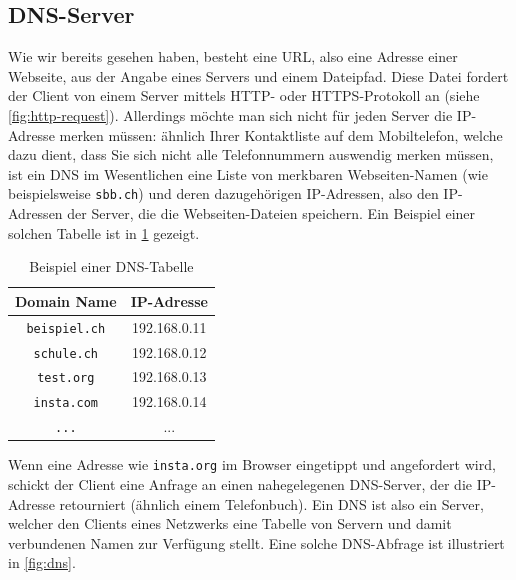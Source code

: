 \subsection{\texorpdfstring{\gls{DNS}-Server}{DNS-Server}}
Wie wir bereits gesehen haben, besteht eine \gls{URL}, also eine Adresse einer Webseite, aus der Angabe eines Servers und einem Dateipfad. Diese Datei fordert der Client von einem Server mittels \gls{HTTP}- oder \gls{HTTPS}-Protokoll an (siehe \cref{fig:http-request}). Allerdings möchte man sich nicht für jeden Server die IP-Adresse merken müssen: ähnlich Ihrer Kontaktliste auf dem Mobiltelefon, welche dazu dient, dass Sie sich nicht alle Telefonnummern auswendig merken müssen, ist ein \gls{DNS} im Wesentlichen eine Liste von merkbaren Webseiten-Namen (wie beispielsweise \texttt{sbb.ch}) und deren dazugehörigen \gls{IP}-Adressen, also den \gls{IP}-Adressen der Server, die die Webseiten-Dateien speichern. Ein Beispiel einer solchen Tabelle ist in \cref{tab:dnsEntries} gezeigt.

\begin{table}[H]
	\centering
	\begin{tabular}{c|c}
		\textbf{Domain Name} & \textbf{IP-Adresse} \\
		\midrule\midrule
		\texttt{beispiel.ch} & 192.168.0.11         \\
		\midrule
		\texttt{schule.ch}   & 192.168.0.12         \\
		\midrule
		\texttt{test.org}    & 192.168.0.13         \\
		\midrule
		\texttt{insta.com}   & 192.168.0.14         \\
		\midrule
		\texttt{...}         & ...                  \\
	\end{tabular}
	\caption{Beispiel einer \gls{DNS}-Tabelle}
	\label{tab:dnsEntries}
\end{table}

Wenn eine Adresse wie \texttt{insta.org} im Browser eingetippt und angefordert wird, schickt der Client eine Anfrage an einen nahegelegenen \gls{DNS}-Server, der die \gls{IP}-Adresse retourniert (ähnlich einem Telefonbuch). Ein \gls{DNS} ist also ein Server, welcher den Clients eines Netzwerks eine Tabelle von Servern und damit verbundenen Namen zur Verfügung stellt. Eine solche \gls{DNS}-Abfrage ist illustriert in \cref{fig:dns}.

